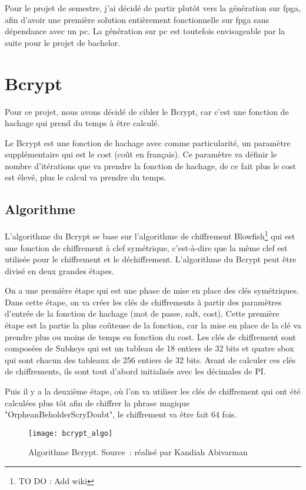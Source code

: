 Pour le projet de semestre, j'ai décidé de partir plutôt vers la génération sur \gls{fpga}, afin d'avoir une première solution entièrement fonctionnelle sur \gls{fpga} sans dépendance avec un \gls{pc}. La génération sur \gls{pc} est toutefois envisageable par la suite pour le projet de bachelor.

\section{Bcrypt}

Pour ce projet, nous avons décidé de cibler le Bcrypt, car c'est une fonction de hachage qui prend du temps à être calculé. 

Le Bcrypt est une fonction de hachage avec comme particularité, un paramètre supplémentaire qui est le cost (coût en français).
Ce paramètre va définir le nombre d'itérations que va prendre la fonction de hachage, de ce fait plus le cost est élevé, plus le calcul va prendre du temps.

\subsection{Algorithme}

L'algorithme du Bcrypt se base sur l'algorithme de chiffrement Blowfish\footnote{TO DO : Add wiki} qui est une fonction de chiffrement à clef symétrique, c'est-à-dire que la même clef est utilisée pour le chiffrement et le déchiffrement. 
L'algorithme du Bcrypt peut être divisé en deux grandes étapes.

On a une première étape qui est une phase de mise en place des clés symétriques. 
Dans cette étape, on va créer les clés de chiffrements à partir des paramètres d'entrée de la fonction de hachage (mot de passe, salt, cost). 
Cette première étape est la partie la plus coûteuse de la fonction, car la mise en place de la clé va prendre plus ou moins de temps en fonction du cost. 
Les clés de chiffrement sont composées de Subkeys qui est un tableau de 18 entiers de 32 bits et quatre \gls{sbox} qui sont chacun des tableaux de 256 entiers de 32 bits. 
Avant de calculer ces clés de chiffrements, ils sont tout d'abord initialisés avec les décimales de PI.

Puis il y a la deuxième étape, où l'on va utiliser les clés de chiffrement qui ont été calculées plus tôt afin de chiffrer la phrase magique "OrpheanBeholderScryDoubt", le chiffrement va être fait 64 fois.

\begin{figure}[tbph!]
	\centering
	\texttt{[image: bcrypt\_algo]}
	\caption[Algorithme Bcrypt]{Algorithme Bcrypt. Source : réalisé par Kandiah Abivarman}
	\label{fig:bcrypt_algo}
\end{figure}

